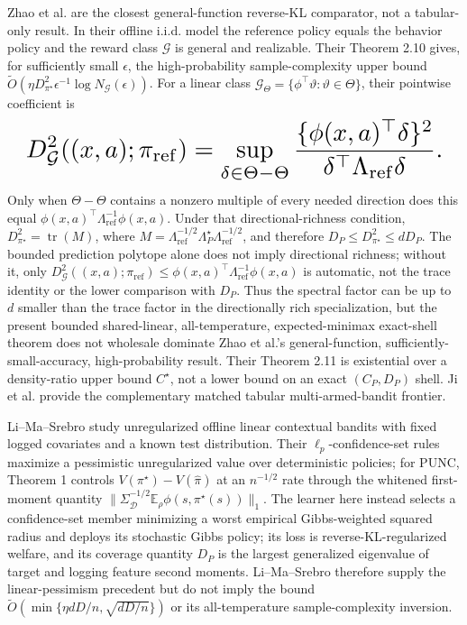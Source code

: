 \documentclass{article}
\begin{document}
Zhao et al. are the closest general-function reverse-KL comparator, not a tabular-only result. In their offline i.i.d. model the reference policy equals the behavior policy and the reward class \(\mathcal G\) is general and realizable. Their Theorem 2.10 gives, for sufficiently small \(\epsilon\), the high-probability sample-complexity upper bound \(\widetilde O\!\left(\eta D_{\pi^\star}^2\epsilon^{-1}\log N_{\mathcal G}(\epsilon)\right)\). For a linear class \(\mathcal G_\Theta=\{\phi^\top\vartheta:\vartheta\in\Theta\}\), their pointwise coefficient is
\[
\makebox[\linewidth][c]{\resizebox{0.98\linewidth}{!}{\par\noindent \makebox[\linewidth][c]{\resizebox{0.98\linewidth}{!}{\(\displaystyle \displaystyle D_{\mathcal G}^2((x,a);\pi_{\mathrm{ref}})=\sup_{\delta\in\Theta-\Theta}\frac{\{\phi(x,a)^\top\delta\}^2}{\delta^\top\Lambda_{\mathrm{ref}}\delta}.\)}}\par\noindent}}
\]
Only when \(\Theta-\Theta\) contains a nonzero multiple of every needed direction does this equal \(\phi(x,a)^\top\Lambda_{\mathrm{ref}}^{-1}\phi(x,a)\). Under that directional-richness condition, \(D_{\pi^\star}^2=\operatorname{tr}(M)\), where \(M=\Lambda_{\mathrm{ref}}^{-1/2}\Lambda_P^\star\Lambda_{\mathrm{ref}}^{-1/2}\), and therefore \(D_P\le D_{\pi^\star}^2\le dD_P\). The bounded prediction polytope alone does not imply directional richness; without it, only \(D_{\mathcal G}^2((x,a);\pi_{\mathrm{ref}})\le\phi(x,a)^\top\Lambda_{\mathrm{ref}}^{-1}\phi(x,a)\) is automatic, not the trace identity or the lower comparison with \(D_P\). Thus the spectral factor can be up to \(d\) smaller than the trace factor in the directionally rich specialization, but the present bounded shared-linear, all-temperature, expected-minimax exact-shell theorem does not wholesale dominate Zhao et al.'s general-function, sufficiently-small-accuracy, high-probability result. Their Theorem 2.11 is existential over a density-ratio upper bound \(C^\star\), not a lower bound on an exact \((C_P,D_P)\) shell. Ji et al. provide the complementary matched tabular multi-armed-bandit frontier.

Li--Ma--Srebro study unregularized offline linear contextual bandits with fixed logged covariates and a known test distribution. Their \(\ell_p\)-confidence-set rules maximize a pessimistic unregularized value over deterministic policies; for PUNC, Theorem 1 controls \(V(\pi^\star)-V(\widehat\pi)\) at an \(n^{-1/2}\) rate through the whitened first-moment quantity \(\|\Sigma_{\mathcal D}^{-1/2}\mathbb E_\rho\phi(s,\pi^\star(s))\|_1\). The learner here instead selects a confidence-set member minimizing a worst empirical Gibbs-weighted squared radius and deploys its stochastic Gibbs policy; its loss is reverse-KL-regularized welfare, and its coverage quantity \(D_P\) is the largest generalized eigenvalue of target and logging feature second moments. Li--Ma--Srebro therefore supply the linear-pessimism precedent but do not imply the bound \(\widetilde O(\min\{\eta dD/n,\sqrt{dD/n}\})\) or its all-temperature sample-complexity inversion.
\end{document}
